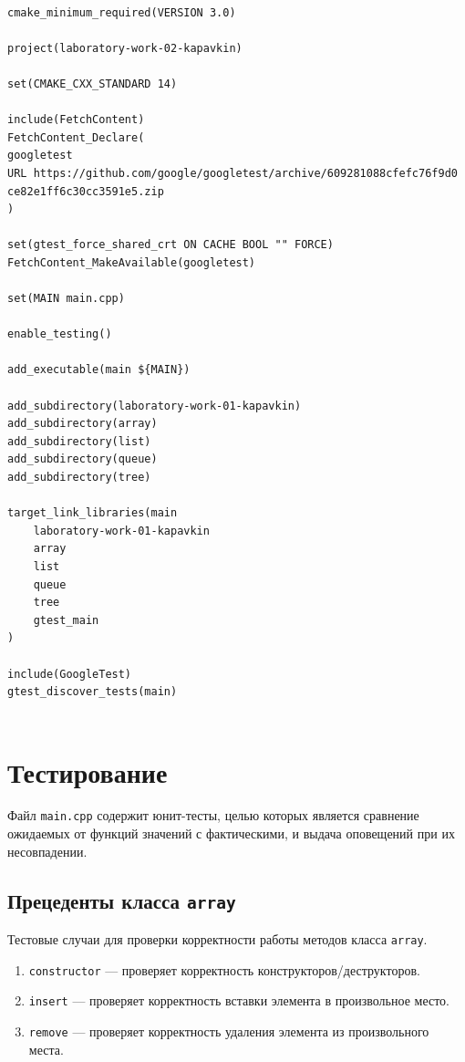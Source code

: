 \documentclass[a4paper,12pt]{article}
\begin{document}
\begin{lstlisting}[caption={Файл сборки CMakeLists.txt},label=CMakeLists]

cmake_minimum_required(VERSION 3.0)

project(laboratory-work-02-kapavkin)

set(CMAKE_CXX_STANDARD 14)

include(FetchContent)
FetchContent_Declare(
googletest
URL https://github.com/google/googletest/archive/609281088cfefc76f9d0
ce82e1ff6c30cc3591e5.zip
)

set(gtest_force_shared_crt ON CACHE BOOL "" FORCE)
FetchContent_MakeAvailable(googletest)

set(MAIN main.cpp)

enable_testing()

add_executable(main ${MAIN})

add_subdirectory(laboratory-work-01-kapavkin)
add_subdirectory(array)
add_subdirectory(list)
add_subdirectory(queue)
add_subdirectory(tree)

target_link_libraries(main
	laboratory-work-01-kapavkin
	array
	list
	queue
	tree
	gtest_main
)

include(GoogleTest)
gtest_discover_tests(main)


\end{lstlisting}

\cleardoublepage

\section{Тестирование}

Файл \verb!main.cpp! содержит юнит-тесты, целью которых является сравнение ожидаемых от функций значений с фактическими, и выдача оповещений при их несовпадении.

\subsection{Прецеденты класса {\tt array}}

Тестовые случаи для проверки корректности работы методов класса {\tt array}.

\begin{enumerate}

\item
\verb!constructor! — проверяет корректность конструкторов/деструкторов.

\item
\verb!insert! — проверяет корректность вставки элемента в произвольное место.

\item
\verb!remove! — проверяет корректность удаления элемента из произвольного места.

\end{enumerate}
\end{document}

